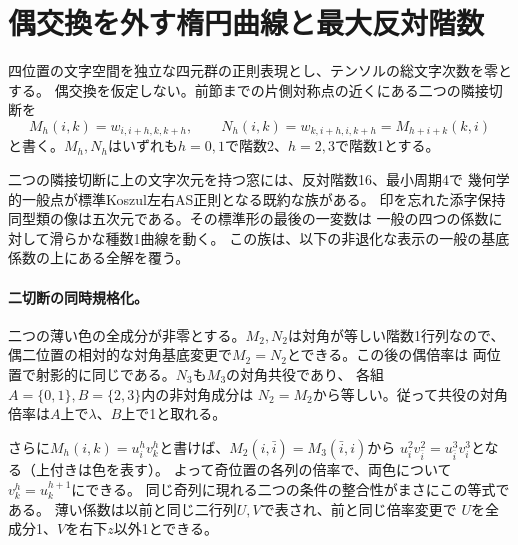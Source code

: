 \section{偶交換を外す楕円曲線と最大反対階数}
\label{sec:klein-elliptic-completion}
四位置の文字空間を独立な四元群の正則表現とし、テンソルの総文字次数を零とする。
偶交換を仮定しない。前節までの片側対称点の近くにある二つの隣接切断を
\[
 M_h(i,k)=w_{i,i+h,k,k+h},\qquad
 N_h(i,k)=w_{k,i+h,i,k+h}=M_{h+i+k}(k,i)
\]
と書く。$M_h,N_h$はいずれも$h=0,1$で階数2、$h=2,3$で階数1とする。

\begin{theorem}\label{thm:klein-elliptic-completion}
二つの隣接切断に上の文字次元を持つ窓には、反対階数16、最小周期4で
幾何学的一般点が標準Koszul左右AS正則となる既約な族がある。
印を忘れた添字保持同型類の像は五次元である。その標準形の最後の一変数は
一般の四つの係数に対して滑らかな種数1曲線を動く。
この族は、以下の非退化な表示の一般の基底係数の上にある全解を覆う。
\end{theorem}

\paragraph{二切断の同時規格化。}
二つの薄い色の全成分が非零とする。$M_2,N_2$は対角が等しい階数1行列なので、
偶二位置の相対的な対角基底変更で$M_2=N_2$とできる。この後の偶倍率は
両位置で射影的に同じである。$N_3$も$M_3$の対角共役であり、
各組$A=\{0,1\},B=\{2,3\}$内の非対角成分は
$N_2=M_2$から等しい。従って共役の対角倍率は$A$上で$\lambda$、$B$上で1と取れる。

さらに$M_h(i,k)=u_i^h v_k^h$と書けば、$M_2(i,\bar i)=M_3(\bar i,i)$から
$u_i^2v_{\bar i}^2=u_{\bar i}^3v_i^3$となる（上付きは色を表す）。
よって奇位置の各列の倍率で、両色について$v_k^h=u_k^{h+1}$にできる。
同じ奇列に現れる二つの条件の整合性がまさにこの等式である。
薄い係数は以前と同じ二行列$U,V$で表され、前と同じ倍率変更で
$U$を全成分1、$V$を右下$z$以外1とできる。

